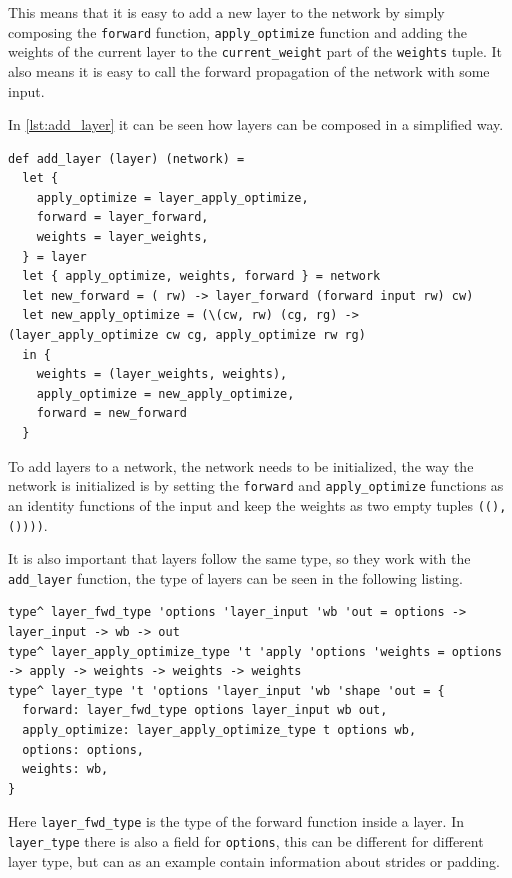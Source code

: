 This means that it is easy to add a new layer to the network by simply composing the \texttt{forward} function, \texttt{apply\_optimize} function and adding the weights of the current layer to the \texttt{current\_weight} part of the \texttt{weights} tuple.
It also means it is easy to call the forward propagation of the network with some input.

In \autoref{lst:add_layer} it can be seen how layers can be composed in a simplified way.

\begin{lstlisting}[caption=A simplified version of adding a layer to a network, label={lst:add_layer}]
def add_layer (layer) (network) =
  let {
    apply_optimize = layer_apply_optimize,
    forward = layer_forward,
    weights = layer_weights,
  } = layer
  let { apply_optimize, weights, forward } = network
  let new_forward = ( rw) -> layer_forward (forward input rw) cw)
  let new_apply_optimize = (\(cw, rw) (cg, rg) -> (layer_apply_optimize cw cg, apply_optimize rw rg)
  in {
    weights = (layer_weights, weights),
    apply_optimize = new_apply_optimize,
    forward = new_forward
  }
\end{lstlisting}

To add layers to a network, the network needs to be initialized, the way the network is initialized is by setting the \texttt{forward} and \texttt{apply\_optimize} functions as an identity functions of the input and keep the weights as two empty tuples \texttt{((), ())))}.

It is also important that layers follow the same type, so they work with the \texttt{add\_layer} function, the type of layers can be seen in the following listing.

\begin{lstlisting}
type^ layer_fwd_type 'options 'layer_input 'wb 'out = options -> layer_input -> wb -> out
type^ layer_apply_optimize_type 't 'apply 'options 'weights = options -> apply -> weights -> weights -> weights
type^ layer_type 't 'options 'layer_input 'wb 'shape 'out = {
  forward: layer_fwd_type options layer_input wb out,
  apply_optimize: layer_apply_optimize_type t options wb,
  options: options,
  weights: wb,
}
\end{lstlisting}

Here \texttt{layer\_fwd\_type} is the type of the forward function inside a layer. In \texttt{layer\_type} there is also a field for \texttt{options}, this can be different for different layer type, but can as an example contain information about strides or padding.

